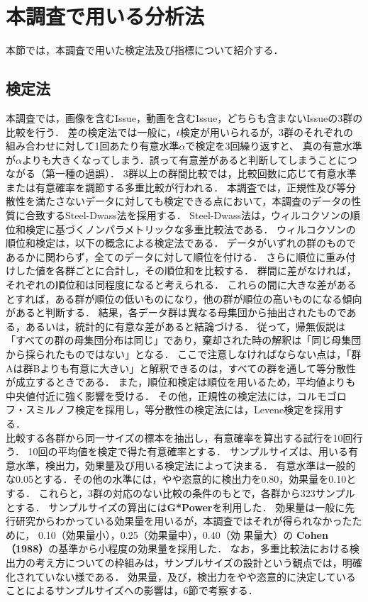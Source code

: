 \section{本調査で用いる分析法\label{method}}
本節では，本調査で用いた検定法及び指標について紹介する．

\subsection{検定法}
本調査では，画像を含むIssue，動画を含むIssue，どちらも含まないIssueの3群の比較を行う．
差の検定法では一般に，$t$検定が用いられるが，3群のそれぞれの組み合わせに対して1回あたり有意水準$\alpha$で検定を3回繰り返すと、
真の有意水準が$\alpha$よりも大きくなってしまう．誤って有意差があると判断してしまうことにつながる（第一種の過誤）．
3群以上の群間比較では，比較回数に応じて有意水準または有意確率を調節する多重比較が行われる．
本調査では，正規性及び等分散性を満たさないデータに対しても検定できる点において，本調査のデータの性質に合致するSteel-Dwass法を採用する．
Steel-Dwass法は，ウィルコクソンの順位和検定に基づくノンパラメトリックな多重比較法である．
ウィルコクソンの順位和検定は，以下の概念による検定法である．
データがいずれの群のものであるかに関わらず，全てのデータに対して順位を付ける．
さらに順位に重み付けした値を各群ごとに合計し，その順位和を比較する．
群間に差がなければ，それぞれの順位和は同程度になると考えられる．
これらの間に大きな差があるとすれば，ある群が順位の低いものになり，他の群が順位の高いものになる傾向があると判断する．
結果，各データ群は異なる母集団から抽出されたものである，あるいは，統計的に有意な差があると結論づける．
従って，帰無仮説は「すべての群の母集団分布は同じ」であり，棄却された時の解釈は「同じ母集団から採られたものではない」となる．
ここで注意しなければならない点は，「群Aは群Bよりも有意に大きい」と解釈できるのは，すべての群を通して等分散性が成立するときである．\cite{Interpretation_For_Nonparametric_Test}
また，順位和検定は順位を用いるため，平均値よりも中央値付近に強く影響を受ける．
その他，正規性の検定法には，コルモゴロフ・スミルノフ検定を採用し，等分散性の検定法には，Levene検定を採用する．
\\
比較する各群から同一サイズの標本を抽出し，有意確率を算出する試行を10回行う．
10回の平均値を検定で得た有意確率とする．
サンプルサイズは、用いる有意水準，検出力，効果量及び用いる検定法によって決まる．
有意水準は一般的な0.05とする．その他の水準には，やや恣意的に検出力を0.80，効果量を0.10とする．
これらと，3群の対応のない比較の条件のもとで，各群から323サンプルとする．
サンプルサイズの算出には\textbf{G*Power}\cite{G*Power1}\cite{G*Power2}を利用した．
効果量は一般に先行研究からわかっている効果量を用いるが，本調査ではそれが得られなかったために， 0.10（効果量小），0.25（効果量中），0.40（効
果量大）の \textbf{Cohen（1988）}の基準から小程度の効果量を採用した．
なお，多重比較法における検出力の考え方についての枠組みは，サンプルサイズの設計という観点では，明確化されていない様である．\cite{Test_Power}
効果量，及び，検出力をやや恣意的に決定していることによるサンプルサイズへの影響は，6節で考察する．


